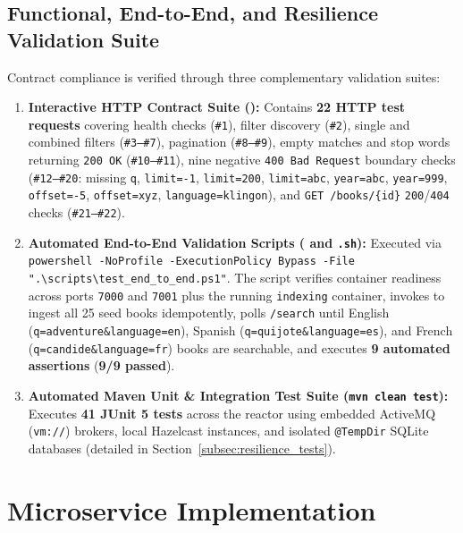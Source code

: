 \documentclass[10pt,a4paper]{article}
\begin{document}
\subsection{Functional, End-to-End, and Resilience Validation Suite}
Contract compliance is verified through three complementary validation suites:
\begin{enumerate}[leftmargin=*,nosep]
    \item \textbf{Interactive HTTP Contract Suite ():} Contains \textbf{22 HTTP test requests} covering health checks (\texttt{\#1}), filter discovery (\texttt{\#2}), single and combined filters (\texttt{\#3--\#7}), pagination (\texttt{\#8--\#9}), empty matches and stop words returning \texttt{200 OK} (\texttt{\#10--\#11}), nine negative \texttt{400 Bad Request} boundary checks (\texttt{\#12--\#20}: missing \texttt{q}, \texttt{limit=-1}, \texttt{limit=200}, \texttt{limit=abc}, \texttt{year=abc}, \texttt{year=999}, \texttt{offset=-5}, \texttt{offset=xyz}, \texttt{language=klingon}), and \texttt{GET /books/\{id\}} \texttt{200}/\texttt{404} checks (\texttt{\#21--\#22}).
    \item \textbf{Automated End-to-End Validation Scripts ( and \texttt{.sh}):} Executed via \texttt{powershell -NoProfile -ExecutionPolicy Bypass -File ".\textbackslash scripts\textbackslash test\_end\_to\_end.ps1"}. The script verifies container readiness across ports \texttt{7000} and \texttt{7001} plus the running \texttt{indexing} container, invokes  to ingest all 25 seed books idempotently, polls \texttt{/search} until English (\texttt{q=adventure\&language=en}), Spanish (\texttt{q=quijote\&language=es}), and French (\texttt{q=candide\&language=fr}) books are searchable, and executes \textbf{9 automated assertions} (\textbf{9/9 passed}).
    \item \textbf{Automated Maven Unit \& Integration Test Suite (\texttt{mvn clean test}):} Executes \textbf{41 JUnit 5 tests} across the reactor using embedded ActiveMQ (\texttt{vm://}) brokers, local Hazelcast instances, and isolated \texttt{@TempDir} SQLite databases (detailed in Section~\ref{subsec:resilience_tests}).
\end{enumerate}

\section{Microservice Implementation}
\label{sec:implementation}
\end{document}
